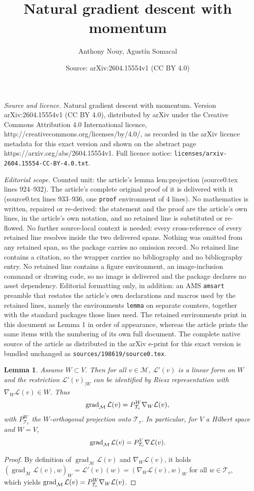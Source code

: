 \documentclass[10pt,a4paper]{amsart}
\title{Natural gradient descent with momentum}
\author{Anthony Nouy, Agust\'in Somacal}
\date{Source: arXiv:2604.15554v1 (CC BY 4.0)}
\newtheorem{lemma}{Lemma}
\newcommand{\cL}{\mathcal{L}}
\newcommand{\cM}{\mathcal{M}}
\newcommand{\cT}{\mathcal{T}}
\newcommand{\colorM}{\color{black}}
\newcommand{\gradM}{\operatorname{grad}_{\cM}}
\renewcommand{\v}{{\colorM v}}
\begin{document}
\maketitle

\noindent\emph{Source and licence.} Natural gradient descent with momentum. Version arXiv:2604.15554v1 (CC BY 4.0), distributed by arXiv under the Creative Commons Attribution 4.0 International licence, http://creativecommons.org/licenses/by/4.0/, as recorded in the arXiv licence metadata for this exact version and shown on the abstract page https://arxiv.org/abs/2604.15554v1. Full licence notice: \texttt{licenses/arxiv-2604.15554-CC-BY-4.0.txt}.\par\smallskip

\noindent\textit{Editorial scope.} Counted unit: the article's lemma lem:projection (source0.tex lines 924--932). The article's complete original proof of it is delivered with it (source0.tex lines 933--936, one \texttt{proof} environment of 4 lines). No mathematics is written, repaired or re-derived: the statement and the proof are the article's own lines, in the article's own notation, and no retained line is substituted or re-flowed.  No further source-local context is needed: every cross-reference of every retained line resolves inside the two delivered spans.  Nothing was omitted from any retained span, so the package carries no omission record.  No retained line contains a citation, so the wrapper carries no bibliography and no bibliography entry.  No retained line contains a figure environment, an image-inclusion command or drawing code, so no image is delivered and the package declares no asset dependency.  Editorial formatting only, in addition: an AMS \texttt{amsart} preamble that restates the article's own declarations and macros used by the retained lines, namely the environments \texttt{lemma} on separate counters, together with the standard packages those lines need.  The retained environments print in this document as Lemma 1 in order of appearance, whereas the article prints the same items with the numbering of its own full document.  The complete native source of the article as distributed in the arXiv e-print for this exact version is bundled unchanged as \texttt{sources/198619/source0.tex}.
\begin{lemma}
\label{lem:projection}
Assume $W\subset V$. Then for all $v\in \cM$, $\cL'(v)$ is  a linear form on $W$ and the restriction $\cL'(v)_{\vert W}$ can be identified by Riesz representation with $\nabla _W \cL(v) \in W$. Thus
$$
\gradM \cL(v) = P^W_{\cT_{v}} \nabla_W \cL(\v),
$$
with $ P^W_{\cT_{v}} $ the $W$-orthogonal projection onto $\cT_v.$ 
In particular, for $V$ a Hilbert space and $W=V$, $$\gradM \cL(v) = P^V_{\cT_{v}} \nabla \cL(\v).$$
\end{lemma}

\begin{proof}
By definition of  $\gradM \cL(v)$ and  $\nabla_W \cL(v)$, it holds
$(\gradM \cL(v) , w)_W = \cL'(v)(w) = (\nabla_W \cL(v) , w)_W$ for all $w \in \cT_v$, which  yields $\gradM \cL(v) = P^W_{\cT_v} \nabla_W \cL(\v)$.
\end{proof}
\end{document}
